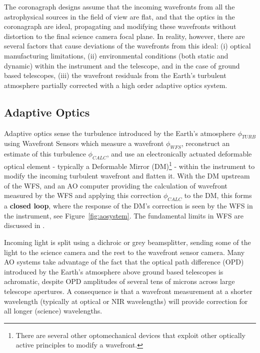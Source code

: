 \documentclass[letterpaper]{ar-1col}
\begin{document}
The coronagraph designs assume that the incoming wavefronts from all the astrophysical sources in the field of view are flat, and that the optics in the coronagraph are ideal, propagating and modifying these wavefronts without distortion to the final science camera focal plane.
%
In reality, however, there are several factors that cause deviations of the wavefronts from this ideal: (i) optical manufacturing limitations, (ii) environmental conditions (both static and dynamic) within the instrument and the telescope, and in the case of ground based telescopes, (iii) the wavefront residuals from the Earth's turbulent atmosphere partially corrected with a high order adaptive optics system.

\subsection{Adaptive Optics}

Adaptive optics sense the turbulence introduced by the Earth's atmosphere $\phi_{TURB}$ using Wavefront Sensors which measure a wavefront $\phi_{WFS}$, reconstruct an estimate of this turbulence $\phi_{CALC}$, and use an electronically actuated deformable optical element - typically a Deformable Mirror (DM)\footnote{There are several other optomechanical devices that exploit other optically active principles to modify a wavefront.} - within the instrument to modify the incoming turbulent wavefront and flatten it.
%
With the DM upstream of the WFS, and an AO computer providing the calculation of wavefront measured by the WFS and applying this correction $\phi_{CALC}$ to the DM, this forms a {\bf closed loop}, where the response of the DM's correction is seen by the WFS in the instrument, see Figure~\ref{fig:aosystem}.
%
The fundamental limits in WFS are discussed in \citet{Guyon05-1}.
%
\begin{armarginnote}[]
\end{armarginnote}
%
Incoming light is split using a dichroic or grey beamsplitter, sending some of the light to the science camera and the rest to the wavefront sensor camera.
%
Many AO systems take advantage of the fact that the optical path difference (OPD) introduced by the Earth's atmosphere above ground based telescopes is achromatic, despite OPD amplitudes of several tens of microns across large telescope apertures.
%
A consequence is that a wavefront measurement at a shorter wavelength (typically at optical or NIR wavelengths) will provide correction for all longer (science) wavelengths.
\end{document}
